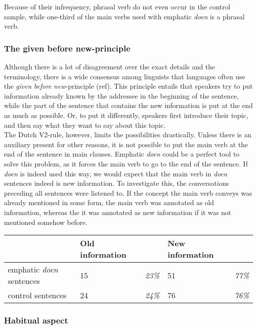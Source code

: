 \documentclass[12pt]{article}
\begin{document}
Because of their infrequency, phrasal verb do not even occur in the control sample, while one-third of the main verbs used with emphatic \emph{doen} is a phrasal verb.

\subsubsection{The given before new-principle}

Although there is a lot of disagreement over the exact details and the terminology, there is a wide consensus among linguists that languages often use the \emph{given before new}-principle (ref). This principle entails that speakers try to put information already known by the addressee in the beginning of the sentence, while the part of the sentence that contains the new information is put at the end as much as possible. Or, to put it differently, speakers first introduce their topic, and then say what they want to say about this topic.\\\indent
The Dutch V2-rule, however, limits the possibilities drastically. Unless there is an auxiliary present for other reasons, it is not possible to put the main verb at the end of the sentence in main clauses. Emphatic \emph{doen} could be a perfect tool to solve this problem, as it forces the main verb to go to the end of the sentence. If \emph{doen} is indeed used this way, we would expect that the main verb in \emph{doen} sentences indeed is new information. To investigate this, the conversations preceding all sentences were listened to. If the concept the main verb conveys was already mentioned in some form, the main verb was annotated as old information, whereas the it was annotated as new information if it was not mentioned somehow before.

\begin{table}[h]
\begin{tabular}{|l|ll|ll|}
\hline
&Old information&&New information&\\
\hline
emphatic \emph{doen} sentences	&15 	& \emph{23\%}	&51		 &\emph{77\%}\\
control sentences				&24		& \emph{24\%}	&76		 &\emph{76\%}\\
\hline
\end{tabular}
\end{table}


\subsubsection{Habitual aspect}
\end{document}

